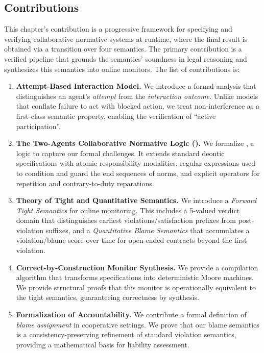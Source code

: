 \subsection{Contributions}
This chapter's contribution is a progressive framework for specifying and verifying collaborative normative systems at runtime, where the final result is obtained via a transition over four semantics. The primary contribution is a verified pipeline that grounds the semantics' soundness in legal reasoning and synthesizes this semantics into online monitors. The list of contributions is:
\begin{enumerate}[Con1]
\item \textbf{Attempt-Based Interaction Model.}
We introduce a formal analysis that distinguishes an agent's \emph{attempt} from the \emph{interaction outcome}. Unlike models that conflate failure to act with blocked action, we treat non-interference as a first-class semantic property, enabling the verification of ``active participation''.
\item \textbf{The Two-Agents Collaborative Normative Logic (\cDL).}
We formalize \cDL, a logic to capture our formal challenges. It extends standard deontic specifications with atomic responsibility modalities, regular expressions used to condition and guard the end sequences of norms, and explicit operators for repetition and contrary-to-duty reparations.
\item \textbf{Theory of Tight and Quantitative Semantics.}
We introduce a \emph{Forward Tight Semantics} for online monitoring. This includes a 5-valued verdict domain that distinguishes earliest violations/satisfaction prefixes from post-violation suffixes, and a \emph{Quantitative Blame Semantics} that accumulates a violation/blame score over time for open-ended contracts beyond the first violation.
\item \textbf{Correct-by-Construction Monitor Synthesis.}
We provide a compilation algorithm that transforms \cDL specifications into deterministic Moore machines. We provide structural proofs that this monitor is operationally equivalent to the tight semantics, guaranteeing correctness by synthesis.
\item \textbf{Formalization of Accountability.}
We contribute a formal definition of \emph{blame assignment} in cooperative settings. We prove that our blame semantics is a consistency-preserving refinement of standard violation semantics, providing a mathematical basis for liability assessment.



\end{enumerate}



